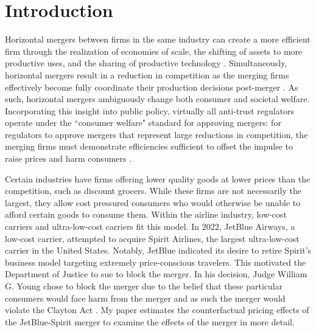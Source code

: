\documentclass{article}
\begin{document}
	\section{Introduction}
	\label{sec:Introduction} 
    Horizontal mergers between firms in the same industry can create a more efficient firm through the realization of economies of scale, the shifting of assets to more productive uses, and the sharing of productive technology \citep{williamson_economies_1968, farrell_horizontal_1990, kaplow_improving_2025}. Simultaneously, horizontal mergers result in a reduction in competition as the merging firms effectively become fully coordinate their production decisions post-merger \citep{stigler_theory_1964}. As such, horizontal mergers ambiguously change both consumer and societal welfare. Incorporating this insight into public policy, virtually all anti-trust regulators operate under the  ``consumer welfare" standard for approving mergers: for regulators to approve mergers that represent large reductions in competition, the merging firms must demonstrate efficiencies sufficient to offset the impulse to raise prices and harm consumers \citep{whinston_chapter_2007}. %

    Certain industries have firms offering lower quality goods at lower prices than the competition, such as discount grocers. While these firms are not necessarily the largest, they allow cost pressured consumers who would otherwise be unable to afford certain goods to consume them. Within the airline industry, low-cost carriers and ultra-low-cost carriers fit this model. In 2022, JetBlue Airways, a low-cost carrier, attempted to acquire Spirit Airlines, the largest ultra-low-cost carrier in the United States. Notably, JetBlue indicated its desire to retire Spirit's business model targeting extremely price-conscious travelers.   This motivated the Department of Justice to sue to block the merger. In his decision, Judge William G. Young chose to block the merger due to the belief that these particular consumers would face harm from the merger and as such the merger would violate the Clayton Act \citep{william_g_young_findings_2024}. My paper estimates the counterfactual pricing effects of the JetBlue-Spirit merger to examine the effects of the merger in more detail. 
    
\end{document}
